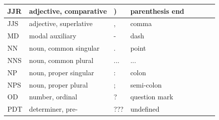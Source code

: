 \begin{table}[htbp]
\begin{tabular} {|lp{4cm}|lp{4cm}|lp{8cm}|lp{0cm}|}
JJR & adjective, comparative & ) & parenthesis end \\ \hline
JJS & adjective, superlative & , & comma \\ \hline
MD & modal auxiliary & - & dash \\ \hline
NN & noun, common singular & . & point \\ \hline
NNS & noun, common plural & ... & ... \\ \hline
NP & noun, proper singular & : & colon \\ \hline
NPS & noun, proper plural & ; & semi-colon \\ \hline
OD & number, ordinal & ? & question mark \\ \hline
PDT & determiner, pre- & ??? & undefined \\ \hline
\end{tabular}
\label{PoS}
\end{table}
